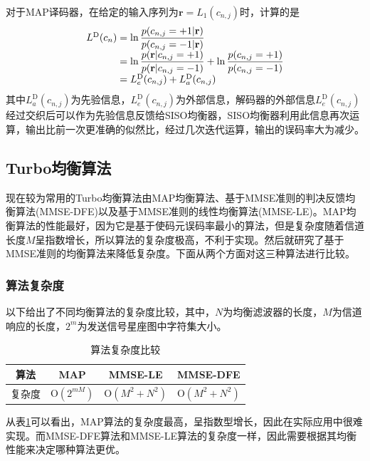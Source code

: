 对于MAP译码器，在给定的输入序列为$\mathbf{r}={L_1(c_{n,j})}$时，计算的是
\begin{eqnarray}
    \begin{array}{l@{\;=\;}l}
        L^{\mathrm{D}}(c_n)&\ln\dfrac{p(c_{n,j}=+1|\mathbf{r})}{p(c_{n,j}=-1|\mathbf{r})}\\
        &\ln\dfrac{p(\mathbf{r}|c_{n,j}=+1)}{p(\mathbf{r}|c_{n,j}=-1)}+\ln\dfrac{p(c_{n,j}=+1)}{p(c_{n,j}=-1)}\\
        &L_e^{\mathrm{D}}(c_{n,j})+L_a^{\mathrm{D}}(c_{n,j})
    \end{array}
    \label{equ:2.35}
\end{eqnarray}
其中$L_a^{\mathrm{D}}(c_{n,j})$为先验信息，$L_e^{\mathrm{D}}(c_{n,j})$为外部信息，解码器的外部信息$L_e^{\mathrm{D}}(c_{n,j})$经过交织后可以作为先验信息反馈给SISO均衡器，SISO均衡器利用此信息再次运算，输出比前一次更准确的似然比，经过几次迭代运算，输出的误码率大为减少。
\subsection{Turbo均衡算法}
现在较为常用的Turbo均衡算法由MAP均衡算法、基于MMSE准则的判决反馈均衡算法(MMSE-DFE)以及基于MMSE准则的线性均衡算法(MMSE-LE)。MAP均衡算法的性能最好，因为它是基于使码元误码率最小的算法，但是复杂度随着信道长度$M$呈指数增长，所以算法的复杂度极高，不利于实现。然后就研究了基于MMSE准则的均衡算法来降低复杂度。下面从两个方面对这三种算法进行比较。

\subsubsection*{算法复杂度}
以下给出了不同均衡算法的复杂度比较，其中，$N$为均衡滤波器的长度，$M$为信道响应的长度，$2^m$为发送信号星座图中字符集大小。

\begin{table}[hbt]
  \centering
  \caption{算法复杂度比较}
  \label{tab:2.1}
  \begin{threeparttable}
  \begin{tabular}{cccc}
    \hline
    算法&MAP&MMSE-LE&MMSE-DFE\\
    \hline
    复杂度&$\mathrm{O}(2^{mM})$&$\mathrm{O}(M^2+N^2)$&$\mathrm{O}(M^2+N^2)$\\
    \hline
  \end{tabular}
\end{threeparttable}
\end{table}

从表\ref{tab:2.1}可以看出，MAP算法的复杂度最高，呈指数型增长，因此在实际应用中很难实现。而MMSE-DFE算法和MMSE-LE算法的复杂度一样，因此需要根据其均衡性能来决定哪种算法更优。
